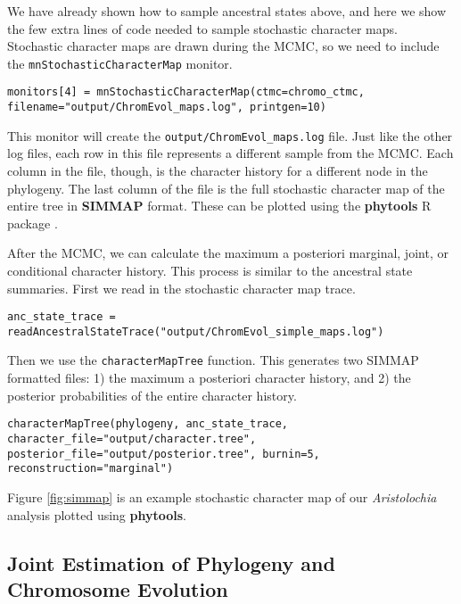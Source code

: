 We have already shown how to sample ancestral states above, and here we show
the few extra lines of \Rev code needed to sample stochastic character maps.
Stochastic character maps are drawn during the MCMC, so we need to include the
\texttt{mnStochasticCharacterMap} monitor.
{\tt \begin{snugshade*}
\begin{lstlisting}
monitors[4] = mnStochasticCharacterMap(ctmc=chromo_ctmc, filename="output/ChromEvol_maps.log", printgen=10)
\end{lstlisting}
\end{snugshade*}}
This monitor will create the \texttt{output/ChromEvol\_maps.log} file.
Just like the other log files, each row in this file represents a different sample from the MCMC.
Each column in the file, though, is the character history for a different node in the phylogeny.
The last column of the file is the full stochastic character map of the entire tree
in \textbf{SIMMAP} \citep{bollback2006simmap} format.
These can be plotted using the \textbf{phytools} R package \citep{revell2012phytools}.

After the MCMC, we can calculate the maximum a posteriori marginal, joint, or conditional
character history. This process is similar to the ancestral state summaries.
First we read in the stochastic character map trace.
{\tt \begin{snugshade*}
\begin{lstlisting}
anc_state_trace = readAncestralStateTrace("output/ChromEvol_simple_maps.log")
\end{lstlisting}
\end{snugshade*}}
Then we use the \texttt{characterMapTree} function. This generates two SIMMAP formatted files:
1) the maximum a posteriori character history, and 2) the posterior probabilities of the
entire character history.
{\tt \begin{snugshade*}
\begin{lstlisting}
characterMapTree(phylogeny, anc_state_trace, character_file="output/character.tree", posterior_file="output/posterior.tree", burnin=5, reconstruction="marginal")
\end{lstlisting}
\end{snugshade*}}
Figure \ref{fig:simmap} is an example stochastic character map of our \textit{Aristolochia} analysis plotted using \textbf{phytools}. 

\medskip
\subsection{Joint Estimation of Phylogeny and Chromosome Evolution}\label{subsect:joint_estimation}


